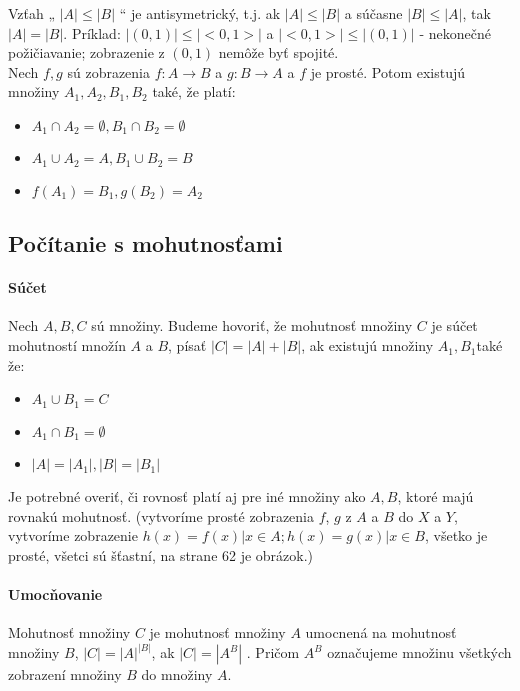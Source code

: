 	Vzťah „ $|A| \leq |B|$ “ je antisymetrický, t.j. ak $|A| \leq |B|$ a súčasne $|B| \leq |A|$, tak $|A| = |B|$. Príklad: $|(0, 1)| \leq |<0,1>|$ a $|<0,1>| \leq |(0,1)|$ - nekonečné požičiavanie; zobrazenie z $(0,1)$ nemôže byť spojité.\\


	Nech $f , g$ sú zobrazenia $f : A \rightarrow B$ a $g : B \rightarrow A$ a $f$ je prosté. Potom existujú množiny $A_{1}, A_{2}, B_{1}, B_{2}$ také, že platí:
	\begin{itemize}
		\item $A_{1} \cap A_{2} = \emptyset, B_{1} \cap B_{2} = \emptyset$
		\item $A_{1} \cup A_{2} = A, B_{1} \cup B_{2} = B$
		\item $f(A_{1}) = B_{1} , g(B_{2}) = A_{2}$
		\end{itemize}

   \subsection*{Počítanie s mohutnosťami} 
   \paragraph{Súčet} 
   Nech $A, B, C$ sú množiny. Budeme hovoriť, že mohutnosť množiny $C$ je súčet mohutností množín $A$ a $B$, písať $|C| = |A| + |B|$, ak existujú množiny $A_{1} , B_{1} $také že:
   \begin{itemize}
	   \item $A_{1} \cup B_{1} = C$
	   \item $A_{1} \cap B_{1} = \emptyset $
	   \item $|A| = |A_{1}|, |B| = |B_{1}| $
   \end{itemize}
   Je potrebné overiť, či rovnosť platí aj pre iné množiny ako $A, B$, ktoré majú rovnakú mohutnosť. (vytvoríme prosté zobrazenia $f$, $g$ z $A$ a $B$ do $X$ a $Y$, vytvoríme zobrazenie $h(x) = f(x) | x \in A; h(x) = g(x) | x \in B$, všetko je prosté, všetci sú šťastní, na strane 62 je obrázok.)

   \paragraph{Umocňovanie}
   Mohutnosť množiny $C$ je mohutnosť množiny $A$ umocnená na mohutnosť množiny $B$, 
   $|C| = |A|^{|B|}$, ak $|C| = |A^{B}|$ . Pričom $A^{B}$ označujeme množinu všetkých zobrazení množiny $B$ do množiny $A$.

